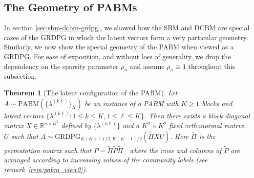 \documentclass[
  12pt,
]{article}
\newtheorem{theorem}{Theorem}[section]
\theoremstyle{definition}
\theoremstyle{definition}
\theoremstyle{definition}
\theoremstyle{definition}
\theoremstyle{remark}
\begin{document}
\hypertarget{the-geometry-of-pabms}{%
\subsection{The Geometry of PABMs}\label{the-geometry-of-pabms}}

In section \ref{sec:sbm-dcbm-grdpg}, we showed how the SBM and DCBM are special cases of the GRDPG in which the latent vectors form a very particular geometry.
Similarly, we now show the special geometry of the PABM when viewed as a GRDPG.
For ease of exposition, and without loss of generality, we drop the dependency on the sparsity parameter \(\rho_n\) and assume \(\rho_n \equiv 1\) throughout this subsection.

\begin{theorem}[The latent configuration of the PABM]
\label{thm:pabm-grdpg}
Let $A \sim \mathrm{PABM}(\{\lambda^{(k \ell)}\}_K)$ be an instance of a
PABM with $K \geq 1$ blocks and latent vectors $\{\lambda^{(k \ell)}
\colon 1 \leq k \leq K, 1 \leq \ell \leq K\}$. 
Then there exists a block diagonal matrix
$X \in \mathbb{R}^{n \times K^2}$ defined by $\{\lambda^{(k \ell)}\}$ and a 
$K^2 \times K^2$ {\em fixed} orthonormal matrix $U$ such 
that $A \sim \mathrm{GRDPG}_{K (K+1) / 2, K (K-1) /
2}(\tilde{\Pi}XU)$. Here $\tilde{\Pi}$ is the permutation matrix
such that $P = \tilde{\Pi} \tilde{P} \tilde{\Pi}^{\top}$ where the
rows and columns of $\tilde{P}$ are arranged according to increasing values of the
community labels (see remark~\ref{rem:pabm_view2}). 
\end{theorem}
\end{document}
